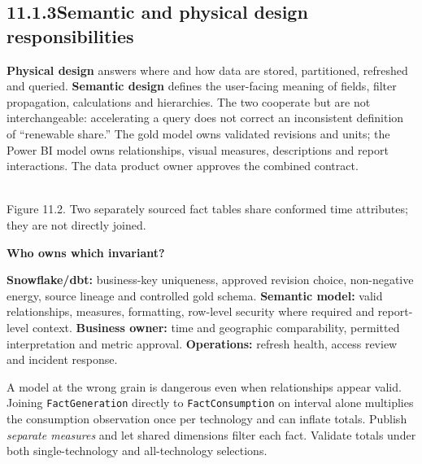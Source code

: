 \documentclass[11pt,twoside]{article}
\newcommand{\topic}[2]{\subsection*{#1\quad #2}}
\begin{document}
\newpage
\topic{11.1.3}{Semantic and physical design responsibilities}
\textbf{Physical design} answers where and how data are stored, partitioned, refreshed and queried. \textbf{Semantic design} defines the user-facing meaning of fields, filter propagation, calculations and hierarchies. The two cooperate but are not interchangeable: accelerating a query does not correct an inconsistent definition of ``renewable share.'' The gold model owns validated revisions and units; the Power BI model owns relationships, visual measures, descriptions and report interactions. The data product owner approves the combined contract.
\begin{center}\\{\fontsize{8}{9}\selectfont\color{inkgray}Figure 11.2. Two separately sourced fact tables share conformed time attributes; they are not directly joined.}\end{center}
\begin{whitebox}\textbf{Who owns which invariant?}\par
\textbf{Snowflake/dbt:} business-key uniqueness, approved revision choice, non-negative energy, source lineage and controlled gold schema. \textbf{Semantic model:} valid relationships, measures, formatting, row-level security where required and report-level context. \textbf{Business owner:} time and geographic comparability, permitted interpretation and metric approval. \textbf{Operations:} refresh health, access review and incident response.\end{whitebox}
A model at the wrong grain is dangerous even when relationships appear valid. Joining \texttt{FactGeneration} directly to \texttt{FactConsumption} on interval alone multiplies the consumption observation once per technology and can inflate totals. Publish \emph{separate measures} and let shared dimensions filter each fact. Validate totals under both single-technology and all-technology selections.
\end{document}
